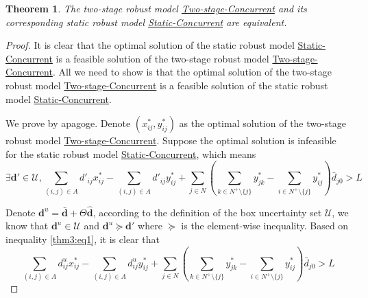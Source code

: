 \documentclass[preprint,review,10pt,round,authoryear]{elsarticle}\usepackage[]{graphicx}\usepackage[]{color}
\theoremstyle{plain}
\newtheorem{thm}{Theorem}
\theoremstyle{definition}
\theoremstyle{remark}
\begin{document}
\begin{thm}
\label{thm:3}
The two-stage robust model \hyperref[2roc:1]{Two-stage-Concurrent} and its corresponding static robust model \hyperref[sro:2]{Static-Concurrent} are equivalent.
\end{thm}
\begin{proof}
It is clear that the optimal solution of the static robust model \hyperref[sro:2]{Static-Concurrent} is a feasible solution of the two-stage robust model \hyperref[2roc:1]{Two-stage-Concurrent}. All we need to show is that the optimal solution of the two-stage robust model \hyperref[2roc:1]{Two-stage-Concurrent} is a feasible solution of the static robust model \hyperref[sro:2]{Static-Concurrent}. 

We prove by apagoge. Denote $(x_{ij}^*,y_{ij}^*)$ as the optimal solution of the two-stage robust model \hyperref[2roc:1]{Two-stage-Concurrent}. Suppose the optimal solution is infeasible for the static robust model \hyperref[sro:2]{Static-Concurrent}, which means 
\begin{equation}
\exists \mathbf{d}'\in\mathcal{U}, \sum_{(i,j)\in A}d'_{ij}x^*_{ij}-\sum_{(i,j)\in A}d'_{ij}y^*_{ij}+\sum_{j\in N}\left(\sum_{k\in N^+\setminus\{j\}}y^*_{jk}-\sum_{i\in N^+\setminus\{j\}}y^*_{ij}\right)\bar{d}_{j0}> L\label{thm3:eq1}
\end{equation}

Denote $\mathbf{d}^{u} = \bar{\mathbf{d}}+\Theta\hat{\mathbf{d}}$, according to the definition of the box uncertainty set $\mathcal{U}$, we know that $\mathbf{d}^{u}\in\mathcal{U}$ and $\mathbf{d}^{u}\succeq \mathbf{d}'$ where $\succeq$ is the element-wise inequality. Based on inequality \eqref{thm3:eq1}, it is clear that
\begin{equation}
\sum_{(i,j)\in A}d^{u}_{ij}x^*_{ij}-\sum_{(i,j)\in A}d^{u}_{ij}y^*_{ij}+\sum_{j\in N}\left(\sum_{k\in N^+\setminus\{j\}}y^*_{jk}-\sum_{i\in N^+\setminus\{j\}}y^*_{ij}\right)\bar{d}_{j0}> L\label{thm3:1}
\end{equation}



\end{proof}
\end{document}
